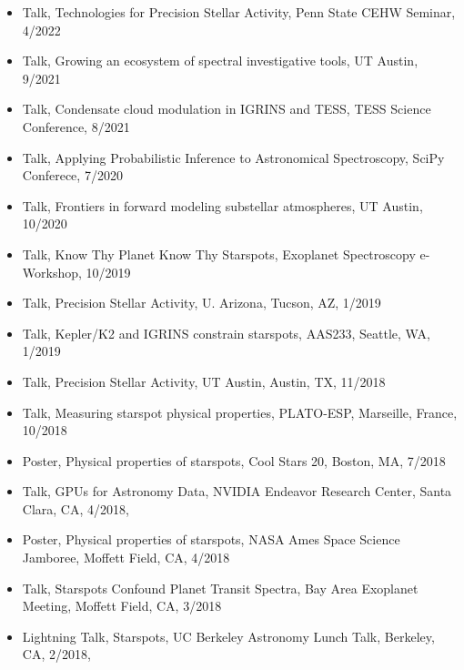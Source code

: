 \documentclass[10pt,letterpaper]{article}
\begin{document}
\begin{itemize}

    
    \item Talk, Technologies for Precision Stellar Activity, Penn State CEHW Seminar, 4/2022
    \item Talk, Growing an ecosystem of spectral investigative tools, UT Austin, 9/2021
    \item Talk, \href{https://youtu.be/0yLgE_8YsIM?t=130}{\faYoutube} Condensate cloud modulation in IGRINS and TESS, TESS Science Conference, 8/2021
    \item Talk, \href{https://youtu.be/ME7kSjPe7mM}{\faYoutube} Applying Probabilistic Inference to Astronomical Spectroscopy, SciPy Conferece, 7/2020
    \item Talk, \href{https://speakerdeck.com/gully/frontiers-in-forward-modeling-substellar-atmospheres}{\faSpeakerDeck} Frontiers in forward modeling substellar atmospheres, UT Austin, 10/2020
    \item Talk, \href{https://speakerdeck.com/gully/know-thy-planet-know-thy-starspots}{\faSpeakerDeck} Know Thy Planet Know Thy Starspots, Exoplanet Spectroscopy e-Workshop, 10/2019
    \item Talk, Precision Stellar Activity, U. Arizona, Tucson, AZ, 1/2019
    \item Talk, \href{https://speakerdeck.com/gully/k2-and-igrins-constrain-starspot-filling-factors-and-temperatures}{\faSpeakerDeck} Kepler/K2 and IGRINS constrain starspots, AAS233, Seattle, WA, 1/2019
    \item Talk, Precision Stellar Activity, UT Austin, Austin, TX, 11/2018
    \item Talk, \href{https://speakerdeck.com/gully/k2-and-high-resolution-near-ir-spectroscopy}{\faSpeakerDeck} Measuring starspot physical properties, PLATO-ESP, Marseille, France, 10/2018
    \item Poster, Physical properties of starspots, Cool Stars 20, Boston, MA, 7/2018
    \item Talk, \href{https://speakerdeck.com/gully/gpus-for-astronomy-data}{\faSpeakerDeck} GPUs for Astronomy Data, NVIDIA Endeavor Research Center, Santa Clara, CA, 4/2018,
    \item Poster, Physical properties of starspots, NASA Ames Space Science Jamboree, Moffett Field, CA, 4/2018
    \item Talk, Starspots Confound Planet Transit Spectra, Bay Area Exoplanet Meeting, Moffett Field, CA, 3/2018
    \item Lightning Talk, Starspots, UC Berkeley Astronomy Lunch Talk, Berkeley, CA, 2/2018,

\end{itemize}
\end{document}
